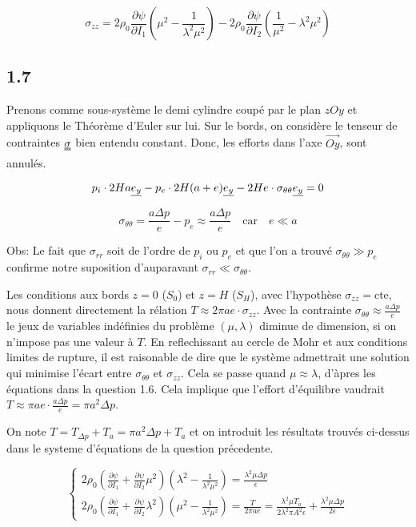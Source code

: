 \documentclass[a4paper,11pt]{article}
\newcommand{\tens}{\uuline}
\newcommand{\verseur}[1]{\uline{e_{#1}}}
\begin{document}
$$\sigma_{zz} = 2 \rho_0 \frac{\partial\psi}{\partial I_1} \left( \mu^2 - \frac{1}{\lambda^2\mu^2} \right) - 2 \rho_0 \frac{\partial\psi}{\partial I_2} \left( \frac{1}{\mu^2} - \lambda^2\mu^2 \right)$$

\subsection*{1.7}

Prenons comme sous-système le demi cylindre coupé par le plan $zOy$ et appliquons le Théorème d'Euler sur lui. Sur le bords, on considère le tenseur de contraintes $\tens{\sigma}$ bien entendu constant. Donc, les efforts dans l'axe $\vec{Oy}$, sont annulés.

$$p_i \cdot 2Ha \verseur{y} - p_e \cdot 2H (a+e) \verseur{y} - 2He \cdot \sigma_{\theta\theta} \verseur{y} = 0$$

$$\sigma_{\theta\theta} = \frac{a\Delta p}{e} - p_e \approx  \frac{a\Delta p}{e} \quad\mathrm{car }\quad e \ll a$$

Obs: Le fait que $\sigma_{rr}$ soit de l'ordre de $p_i$ ou $p_e$ et que l'on a trouvé $\sigma_{\theta\theta} \gg p_e$ confirme notre suposition d'auparavant $\sigma_{rr} \ll \sigma_{\theta\theta}$.

Les conditions aux bords $z=0$ ($S_0$) et $z=H$ ($S_H$), avec l'hypothèse $\sigma_{zz} = \mathrm{cte}$, nous donnent directement la rélation $T \approx 2\pi a e \cdot \sigma_{zz}$. Avec la contrainte $\sigma_{\theta\theta} \approx \frac{a\Delta p}{e}$ le jeux de variables indéfinies du problème $(\mu, \lambda)$ diminue de dimension, si on n'impose pas une valeur à $T$. En reflechissant au cercle de Mohr et aux conditions limites de rupture, il est raisonable de dire que le système admettrait une solution qui minimise l'écart entre $\sigma_{\theta\theta}$ et $\sigma_{zz}$. Cela se passe quand $\mu \approx \lambda$, d'àpres les équations dans la question 1.6. Cela implique que l'effort d'équilibre vaudrait $T \approx \pi ae \cdot \frac{a\Delta p}{e} = \pi a^2 \Delta p$.

On note $T = T_{\Delta p} + T_a = \pi a^2 \Delta p + T_a$ et on introduit les résultats trouvés ci-dessus dans le systeme d'équations de la question précedente.

$$
\begin{cases}
2\rho_0 \left (\frac{\partial\psi}{\partial I_1} + \frac{\partial\psi}{\partial I_2} \mu^2 \right) \left ( \lambda^2 - \frac{1}{\lambda^2\mu^2} \right) = \frac{\lambda^2\mu \Delta p}{\epsilon} \\
2\rho_0 \left (\frac{\partial\psi}{\partial I_1} + \frac{\partial\psi}{\partial I_2} \lambda^2 \right) \left ( \mu^2 - \frac{1}{\lambda^2\mu^2} \right) = \frac{T}{2\pi ae} = \frac{\lambda^2\mu T_a}{2\lambda^2\pi A^2 \epsilon } + \frac{\lambda^2\mu\Delta p}{2\epsilon}
\end{cases}
$$
\end{document}
